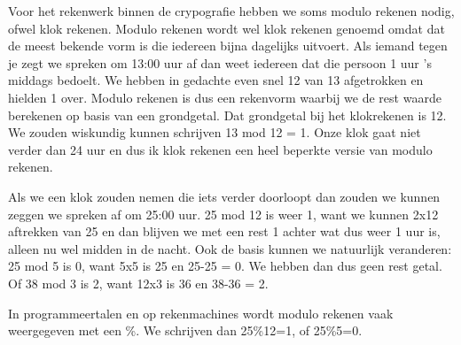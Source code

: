 Voor het rekenwerk binnen de crypografie hebben we soms modulo rekenen nodig, ofwel klok rekenen. Modulo rekenen wordt wel klok rekenen genoemd omdat dat de meest bekende vorm is die iedereen bijna dagelijks uitvoert. Als iemand tegen je zegt we spreken om 13:00 uur af dan weet iedereen dat die persoon 1 uur 's middags bedoelt. We hebben in gedachte even snel 12 van 13 afgetrokken en hielden 1 over. Modulo rekenen is dus een rekenvorm waarbij we de rest waarde berekenen op basis van een grondgetal. Dat grondgetal bij het klokrekenen is 12. We zouden wiskundig kunnen schrijven 13 mod 12 = 1. Onze klok gaat niet verder dan 24 uur en dus ik klok rekenen een heel beperkte versie van modulo rekenen.

Als we een klok zouden nemen die iets verder doorloopt dan zouden we kunnen zeggen we spreken af om 25:00 uur. 25 mod 12 is weer 1, want we kunnen 2x12 aftrekken van 25 en dan blijven we met een rest 1 achter wat dus weer 1 uur is, alleen nu wel midden in de nacht. Ook de basis kunnen we natuurlijk veranderen: 25 mod 5 is 0, want 5x5 is 25 en 25-25 = 0. We hebben dan dus geen rest getal. Of 38 mod 3 is 2, want 12x3 is 36 en 38-36 = 2.

In programmeertalen en op rekenmachines wordt modulo rekenen vaak weergegeven met een \%. We schrijven dan 25\%12=1, of 25\%5=0.
